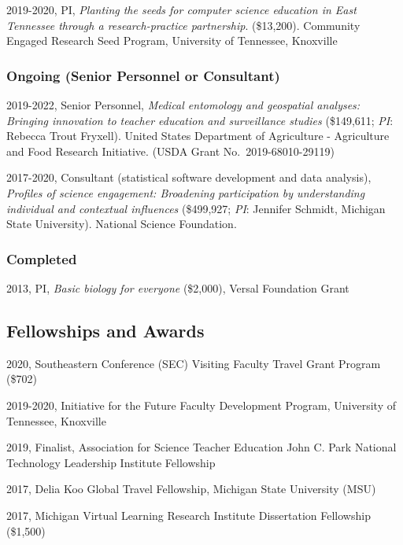 \documentclass[14,]{article}
\begin{document}
2019-2020, PI, \emph{Planting the seeds for computer science education
in East Tennessee through a research-practice partnership}. (\$13,200).
Community Engaged Research Seed Program, University of Tennessee,
Knoxville

\hypertarget{ongoing-senior-personnel-or-consultant}{%
\subsubsection{Ongoing (Senior Personnel or
Consultant)}\label{ongoing-senior-personnel-or-consultant}}

2019-2022, Senior Personnel, \emph{Medical entomology and geospatial
analyses: Bringing innovation to teacher education and surveillance
studies} (\$149,611; \emph{PI}: Rebecca Trout Fryxell). United States
Department of Agriculture - Agriculture and Food Research Initiative.
(USDA Grant No.~2019-68010-29119)

2017-2020, Consultant (statistical software development and data
analysis), \emph{Profiles of science engagement: Broadening
participation by understanding individual and contextual influences}
(\$499,927; \emph{PI}: Jennifer Schmidt, Michigan State University).
National Science Foundation.

\hypertarget{completed}{%
\subsubsection{Completed}\label{completed}}

2013, PI, \emph{Basic biology for everyone} (\$2,000), Versal Foundation
Grant

\hypertarget{fellowships-and-awards}{%
\subsection{Fellowships and Awards}\label{fellowships-and-awards}}

2020, Southeastern Conference (SEC) Visiting Faculty Travel Grant
Program (\$702)

2019-2020, Initiative for the Future Faculty Development Program,
University of Tennessee, Knoxville

2019, Finalist, Association for Science Teacher Education John C. Park
National Technology Leadership Institute Fellowship

2017, Delia Koo Global Travel Fellowship, Michigan State University
(MSU)

2017, Michigan Virtual Learning Research Institute Dissertation
Fellowship (\$1,500)
\end{document}
